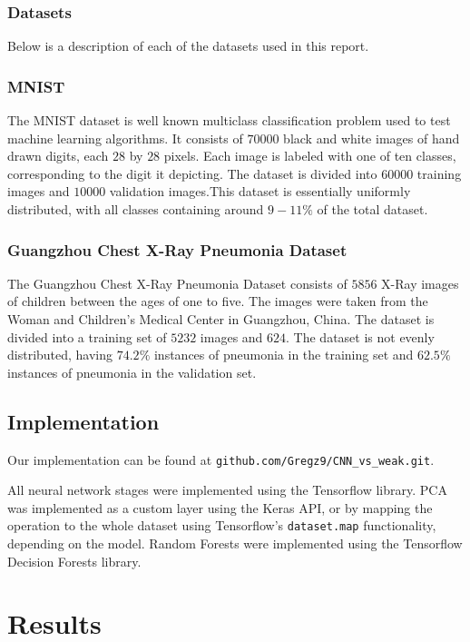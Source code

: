 \documentclass[onecolumn,10pt,cleanfoot]{asme2ej}
\begin{document}
\subsubsection{Datasets}

Below is a description of each of the datasets used in this report.

\subsubsection{MNIST}

The MNIST dataset is well known multiclass classification problem used to test machine learning algorithms. It consists of $70000$ black and white images of hand drawn digits, each $28$ by $28$ pixels. Each image is labeled with one of ten classes, corresponding to the digit it depicting. The dataset is divided into $60000$ training images and $10000$ validation images.This dataset is essentially uniformly distributed, with all classes containing around $9 - 11\%$ of the total dataset.

\subsubsection{Guangzhou Chest X-Ray Pneumonia Dataset}

The Guangzhou Chest X-Ray Pneumonia Dataset consists of $5856$ X-Ray images of children between the ages of one to five. The images were taken from the Woman and Children's Medical Center in Guangzhou, China. The dataset is divided into a training set of $5232$ images and $624$. The dataset is not evenly distributed, having $74.2\%$ instances of pneumonia in the training set and $62.5\%$ instances of pneumonia in the validation set.

\subsection{Implementation}

Our implementation can be found at \texttt{github.com/Gregz9/CNN\_vs\_weak.git}.

All neural network stages were implemented using the Tensorflow library. PCA was implemented as a custom layer using the Keras API, or by mapping the operation to the whole dataset using Tensorflow's \texttt{dataset.map} functionality, depending on the model. Random Forests were implemented using the Tensorflow Decision Forests library.

\section{Results}
\end{document}
